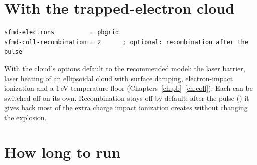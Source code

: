 \section{With the trapped-electron cloud}

\begin{lstlisting}
sfmd-electrons          = pbgrid
sfmd-coll-recombination = 2      ; optional: recombination after the pulse
\end{lstlisting}
With  the cloud's options default to the recommended model: the laser barrier, laser
heating of an ellipsoidal cloud with surface damping, electron-impact ionization and a 1\,eV temperature floor
(Chapters~\ref{ch:pb}--\ref{ch:coll}).
Each can be switched off on its own.
Recombination stays off by default; after the pulse () it gives back most of the extra charge impact
ionization creates without changing the explosion.


\section{How long to run}

